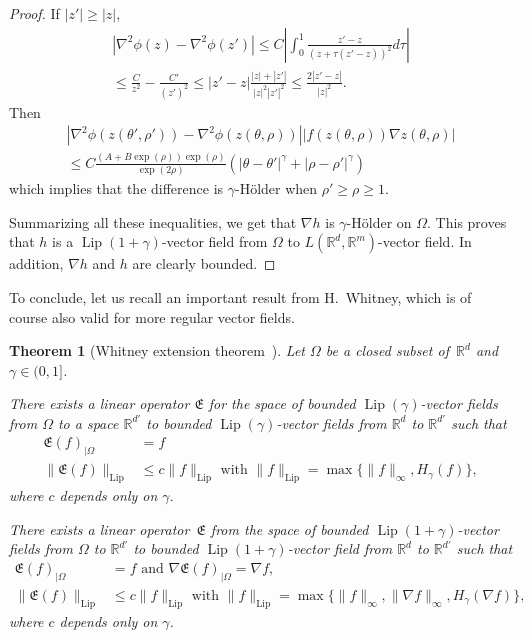 \documentclass[a4paper,12pt]{article}
\newtheorem{theorem}{Theorem}
\theoremstyle{definition}
\newcommand{\RR}{\mathbb{R}}
\newcommand{\fE}{\mathfrak{E}}
\DeclareMathOperator{\Lip}{Lip}
\begin{document}
\begin{proof}
If $|z'|\geq |z|$, 
\begin{multline*}
|\nabla^2\phi(z)-\nabla^2\phi(z')|
\leq C\left|\int_0^1 \frac{z'-z}{(z+\tau(z'-z))^2}d\tau
\right|\\
\leq \frac{C}{z^2}-\frac{C'}{(z')^2}
\leq |z'-z|\frac{|z|+|z'|}{|z|^2|z'|^2}
\leq \frac{2|z'-z|}{|z|^2}.
\end{multline*}
Then 
\begin{multline}
|\nabla^2\phi(z(\theta',\rho'))-\nabla^2\phi(z(\theta,\rho))|
|f(z(\theta,\rho))\nabla z(\theta,\rho)|\\
\leq 
C\frac{(A+B\exp(\rho))\exp(\rho)}{\exp(2\rho)}
(|\theta-\theta'|^{\gamma}+|\rho-\rho'|^{\gamma})
\end{multline}
which implies that the difference is $\gamma$-Hölder
when $\rho'\geq \rho\geq 1$.

Summarizing all these inequalities, we get that 
$\nabla h$ is $\gamma$-Hölder on $\Omega$.
This proves that $h$ is a $\Lip(1+\gamma)$-vector field from $\Omega$ to $L(\RR^d,\RR^m)$-vector field.
In addition, $\nabla h$ and $h$ are clearly bounded.
\end{proof}

To conclude, let us recall an important result from H.~Whitney, 
which is of course also valid for more regular vector fields.

\begin{theorem}[Whitney extension theorem~\cites{whitney,stein70a}]
\label{thm-1}
Let $\Omega$ be a closed subset of~$\RR^d$ and $\gamma\in(0,1]$.

There exists a linear operator $\fE$
for the space of bounded 
$\Lip(\gamma)$-vector fields from $\Omega$ to a space $\RR^{d'}$
to bounded $\Lip(\gamma)$-vector fields from $\RR^d$ to $\RR^{d'}$ such that 
\begin{align*}
\fE(f)_{|\Omega}&=f\\
\|\fE(f)\|_{\Lip}&\leq c\|f\|_{\Lip}\text{ with }
\|f\|_{\Lip}=\max\{\|f\|_{\infty}, H_\gamma(f)\},
\end{align*}
where $c$ depends only on $\gamma$.

There exists a linear operator~$\fE$ from the space of 
bounded $\Lip(1+\gamma)$-vector fields from $\Omega$ to $\RR^{d'}$ to bounded
$\Lip(1+\gamma)$-vector field from $\RR^d$ to $\RR^{d'}$ such that 
\begin{align*}
\fE(f)_{|\Omega}&=f\text{ and }\nabla \fE(f)_{|\Omega}=\nabla f,\\
\|\fE(f)\|_{\Lip}&\leq c\|f\|_{\Lip}
\text{ with }\|f\|_{\Lip}=\max\{\|f\|_{\infty}, \|\nabla f\|_{\infty}, H_\gamma(\nabla f)\},
\end{align*}
where $c$ depends only on $\gamma$.
\end{theorem}
\end{document}
